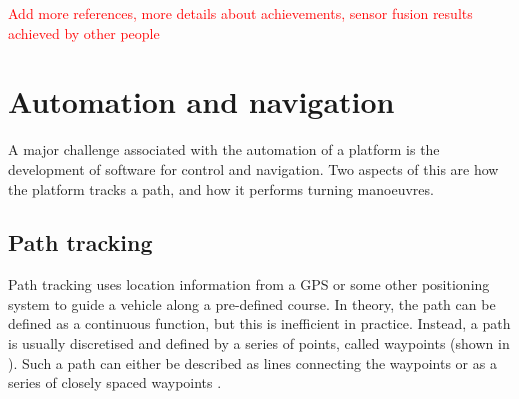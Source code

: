 \documentclass[main.tex]{subfiles}
\begin{document}
\textcolor{red}{Add more references, more details about achievements, sensor fusion results achieved by other people}
\section{Automation and navigation}
A major challenge associated with the automation of a platform is the development of software for control and navigation. Two aspects of this are how the platform tracks a path, and how it performs turning manoeuvres. 

\subsection{Path tracking}
Path tracking uses location information from a GPS or some other positioning system to guide a vehicle along a pre-defined course. In theory, the path can be defined as a continuous function, but this is inefficient in practice. Instead, a path is usually discretised and defined by a series of points, called waypoints (shown in ). Such a path can either be described as lines connecting the waypoints or as a series of closely spaced waypoints \parencite{Giesbrecht2005}.
\end{document}
